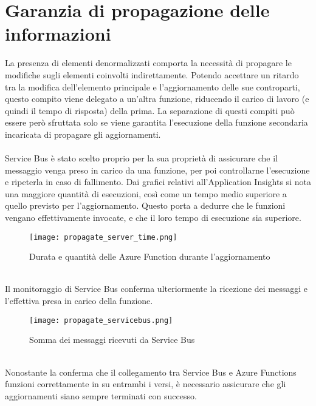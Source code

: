 \section{Garanzia di propagazione delle informazioni}

La presenza di elementi denormalizzati comporta la necessità 
di propagare le modifiche sugli elementi coinvolti indirettamente.
Potendo accettare un ritardo tra la modifica dell'elemento principale 
e l'aggiornamento delle sue controparti, 
questo compito viene delegato a un'altra funzione,
riducendo il carico di lavoro (e quindi il tempo di risposta) della prima.
La separazione di questi compiti può essere però sfruttata 
solo se viene garantita l'esecuzione della funzione secondaria incaricata di propagare gli aggiornamenti.\\
\\
Service Bus è stato scelto proprio per la sua proprietà 
di assicurare che il messaggio venga preso in carico da una funzione, 
per poi controllarne l'esecuzione e ripeterla in caso di fallimento.
Dai grafici relativi all'Application Insights si nota una maggiore quantità di esecuzioni, 
così come un tempo medio superiore a quello previsto per l'aggiornamento.
Questo porta a dedurre che le funzioni vengano effettivamente invocate, 
e che il loro tempo di esecuzione sia superiore.\\
\begin{figure}[htbp]
    \begin{center}
        \texttt{[image: propagate\_server\_time.png]}
        \caption{Durata e quantità delle Azure Function durante l'aggiornamento}
    \end{center}
\end{figure}
\\
Il monitoraggio di Service Bus conferma ulteriormente la ricezione dei messaggi e 
l'effettiva presa in carico della funzione.\\
\begin{figure}[htbp]
    \begin{center}
        \texttt{[image: propagate\_servicebus.png]}
        \caption{Somma dei messaggi ricevuti da Service Bus}
    \end{center}
\end{figure}
\\
\clearpage
Nonostante la conferma che il collegamento tra Service Bus e Azure Functions
funzioni correttamente in su entrambi i versi, 
è necessario assicurare che gli aggiornamenti siano sempre terminati con successo.
